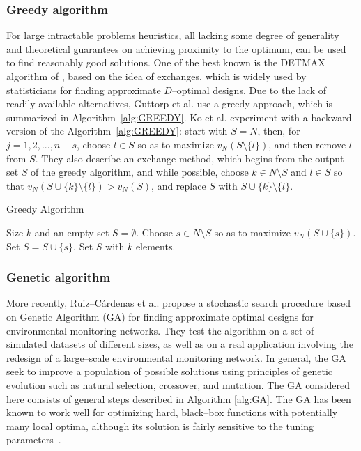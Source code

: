 \documentclass[]{interact}
\theoremstyle{plain}%
\theoremstyle{definition}
\theoremstyle{remark}
\begin{document}
\subsubsection{Greedy algorithm} 
For large intractable problems heuristics, all lacking some degree of generality and theoretical guarantees on achieving proximity to the optimum, can be used to find reasonably good solutions. One of the best known is the DETMAX algorithm of \cite{Mitchella,Mitchellb}, based on the idea of exchanges, which is widely used by statisticians for finding approximate $D$--optimal designs. Due to the lack of readily available alternatives, Guttorp et al. \cite{Guttorp} use a greedy approach, which is summarized in Algorithm~\ref{alg:GREEDY}. Ko et al. \cite{KO1995} experiment with a backward version of the Algorithm~\ref{alg:GREEDY}: start with $S = N$, then, for $j = 1, 2, ..., n-s$, choose $l \in S$ so as to maximize $v_{N} (S \setminus \{l\})$, and then remove $l$ from $S$. They also describe an exchange method, which begins from the output set $S$ of the greedy algorithm, and while possible, choose $k \in N \setminus S$ and $l \in S$ so that $v_{N} (S \cup \{k\} \setminus \{l\}) > v_{N} (S)$, and replace $S$ with $S \cup \{k\} \setminus \{l\}$.

\begin{algorithm}[tbh]
\caption{Greedy Algorithm}
\label{alg:GREEDY}
\begin{algorithmic}
\REQUIRE Size $k$ and an empty set $S=\emptyset$.
        \STATE Choose $s \in N \setminus S$ so as to maximize $v_{N} (S \cup \{s\})$.
        \STATE Set $S=S \cup \{s\}$.
\ENDFOR
\ENSURE Set $S$ with $k$ elements.
\end{algorithmic}
\end{algorithm}

\subsubsection{Genetic algorithm}
More recently, Ruiz--C\'{a}rdenas et al.\cite{Schmidt} propose a stochastic search procedure based on Genetic Algorithm (GA) \cite{Holland} for finding approximate optimal designs for environmental monitoring networks. They test the algorithm on a set of simulated datasets of different sizes, as well as on a real application involving the redesign of a large--scale environmental monitoring network. In general, the GA seek to improve a population of possible solutions using principles of genetic evolution such as natural selection, crossover, and mutation. The GA considered here consists of general steps described in Algorithm \ref{alg:GA}. The GA has been known to work well for optimizing hard, black--box functions with potentially many local optima, although its solution is fairly sensitive to the tuning parameters~\cite{Goldberg,Whitley}.
\end{document}

